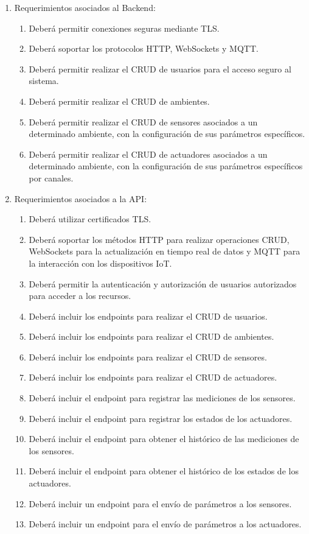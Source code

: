 \documentclass[
11pt, %
codirector, %
]{charter}
\begin{document}
\begin{enumerate}
	\item Requerimientos asociados al Backend:
	      \begin{enumerate}
		      \item Deberá permitir conexiones seguras mediante TLS.
		      \item Deberá soportar los protocolos HTTP, WebSockets y MQTT.
		      \item Deberá permitir realizar el CRUD de usuarios para el acceso seguro al sistema.
		      \item Deberá permitir realizar el CRUD de ambientes.
		      \item Deberá permitir realizar el CRUD de sensores asociados a un determinado ambiente, con la configuración de sus parámetros específicos.
		      \item Deberá permitir realizar el CRUD de actuadores asociados a un determinado ambiente, con la configuración de sus parámetros específicos por canales.
	      \end{enumerate}

	\item Requerimientos asociados a la API:
	      \begin{enumerate}
		      \item Deberá utilizar certificados TLS.
		      \item Deberá soportar los métodos HTTP para realizar operaciones CRUD, WebSockets para la actualización en tiempo real de datos y
		            MQTT para la interacción con los dispositivos IoT.
		      \item Deberá permitir la autenticación y autorización de usuarios autorizados para acceder a los recursos.
		      \item Deberá incluir los endpoints para realizar el CRUD de usuarios.
		      \item Deberá incluir los endpoints para realizar el CRUD de ambientes.
		      \item Deberá incluir los endpoints para realizar el CRUD de sensores.
		      \item Deberá incluir los endpoints para realizar el CRUD de actuadores.
		      \item Deberá incluir el endpoint para registrar las mediciones de los sensores.
		      \item Deberá incluir el endpoint para registrar los estados de los actuadores.
		      \item Deberá incluir el endpoint para obtener el histórico de las mediciones de los sensores.
		      \item Deberá incluir el endpoint para obtener el histórico de los estados de los actuadores.
		      \item Deberá incluir un endpoint para el envío de parámetros a los sensores.
		      \item Deberá incluir un endpoint para el envío de parámetros a los actuadores.
	      \end{enumerate}


\end{enumerate}
\end{document}
